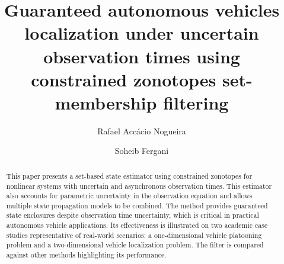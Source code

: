 \documentclass{ifacconf}
\begin{document}
\begin{frontmatter}


\title{Guaranteed autonomous vehicles localization under uncertain observation times using constrained zonotopes set-membership filtering} 


\author[First]{Rafael Accácio Nogueira} 
\author[Second]{Soheib Fergani} 

\address[First]{Univ Angers, LARIS, SFR MATHSTIC, {F-49000 Angers, France}  (e-mail:~rafael-accacio.nogueira@univ-angers.fr)}
\address[Second]{Université de Toulouse, LAAS-CNRS, Toulouse, France (e-mail:~sfergani@laas.fr)}
\begin{abstract}                %
  This paper presents a set-based state estimator using constrained zonotopes for nonlinear systems with uncertain and asynchronous observation times.
  This estimator also accounts for parametric uncertainty in the observation equation and allows multiple state propagation models to be combined. The method provides guaranteed state enclosures despite observation time uncertainty, which is critical in practical autonomous vehicle applications. Its effectiveness is illustrated on two academic case studies representative of real-world scenarios: a one-dimensional vehicle platooning problem and a two-dimensional vehicle localization problem. The filter is compared against other methods highlighting its performance.
\end{abstract}


\end{frontmatter}
\end{document}
